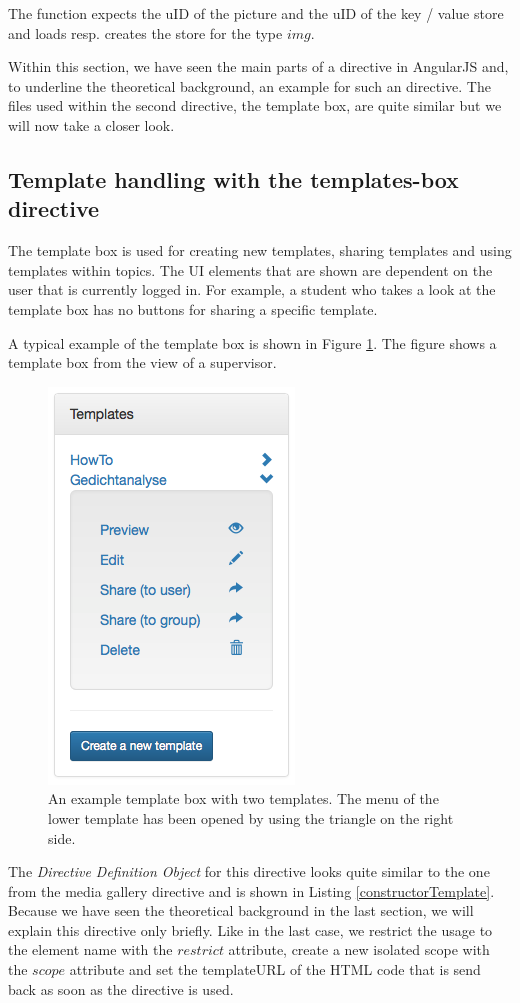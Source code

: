 The function expects the uID of the picture and the uID of the key / value store and loads resp. creates the store for the type $img$.

Within this section, we have seen the main parts of a directive in AngularJS and, to underline the theoretical background, an example for such an directive.
The files used within the second directive, the template box, are quite similar but we will now take a closer look.

\subsection{Template handling with the templates-box directive}
The template box is used for creating new templates, sharing templates and using templates within topics. The \ac{UI} elements that are shown are dependent on the user that is currently logged in. For example, a student who takes a look at the template box has no buttons for sharing a specific template.

A typical example of the template box is shown in Figure \ref{templateBox}. The figure shows a template box from the view of a supervisor.

\begin{figure}[th]
\centerline{\includegraphics[width=.4\textwidth]{gfx/templateBox}}
\caption{An example template box with two templates. The menu of the lower template has been opened by using the triangle on the right side.}
\label{templateBox}
\end{figure}

The \emph{Directive Definition Object} for this directive looks quite similar to the one from the media gallery directive and is shown in Listing \ref{constructorTemplate}. Because we have seen the theoretical background in the last section, we will explain this directive only briefly. Like in the last case, we restrict the usage to the element name with the $restrict$ attribute, create a new isolated scope with the $scope$ attribute and set the templateURL of the \ac{HTML} code that is send back as soon as the directive is used. 

